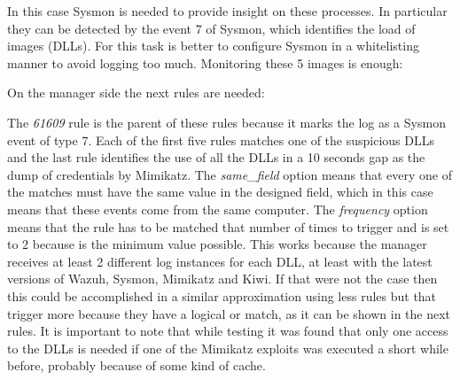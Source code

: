 \linej
In this case Sysmon is needed to provide insight on these processes. In particular they can be detected by the event 7 of Sysmon, which identifies the load of images (DLLs)\cite{sysmon}\cite{sysmon_event_7_mimikatz}.
\linej
\linej
For this task is better to configure Sysmon in a whitelisting manner to avoid logging too much. Monitoring these 5 images is enough:
\linej

\linej
On the manager side the next rules are needed:
\linej

\linej
The \textit{61609} rule is the parent of these rules because it marks the log as a Sysmon event of type 7. Each of the first five rules matches one of the suspicious DLLs and the last rule identifies the use of all the DLLs in a 10 seconds gap as the dump of credentials by Mimikatz.
The \textit{same\_field} option means that every one of the matches must have the same value in the designed field, which in this case means that these events come from the same computer.
\linej
The \textit{frequency} option means that the rule has to be matched that number of times to trigger and is set to 2 because is the minimum value possible. This works because the manager receives at least 2 different log instances for each DLL, at least with the latest versions of Wazuh, Sysmon, Mimikatz and Kiwi.
If that were not the case then this could be accomplished in a similar approximation using less rules but that trigger more because they have a logical or match, as it can be shown in the next rules. It is important to note that while testing it was found that only one access to the DLLs is needed if one of the Mimikatz exploits was executed a short while before, probably because of some kind of cache.
\linej


